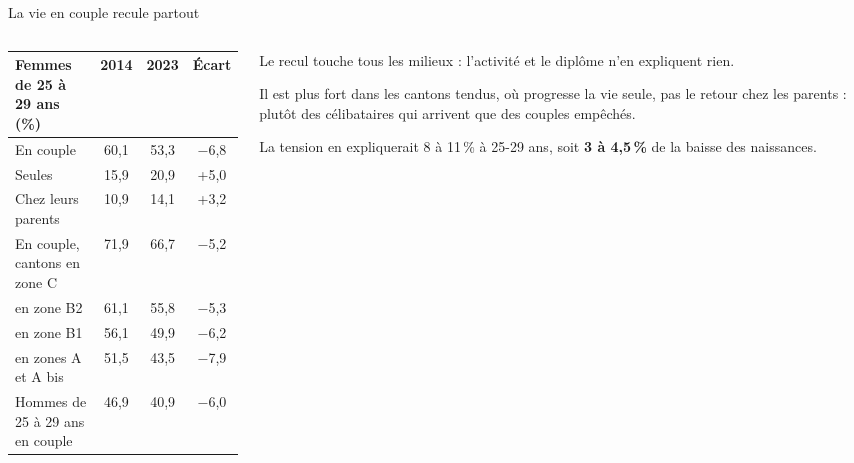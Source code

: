 \documentclass[10pt,aspectratio=169]{beamer}
\begin{document}
\begin{frame}{La vie en couple recule partout}
  \begin{columns}[T]
    \begin{column}{0.54\textwidth}
      \footnotesize\setlength{\tabcolsep}{4pt}
      \begin{tabular}{@{}lccc@{}}
        \toprule
        Femmes de 25 à 29 ans (\%) & 2014 & 2023 & Écart \\
        \midrule
        En couple & 60,1 & 53,3 & $-$6,8 \\
        Seules & 15,9 & 20,9 & +5,0 \\
        Chez leurs parents & 10,9 & 14,1 & +3,2 \\
        \midrule
        En couple, cantons en zone C & 71,9 & 66,7 & $-$5,2 \\
        \quad en zone B2 & 61,1 & 55,8 & $-$5,3 \\
        \quad en zone B1 & 56,1 & 49,9 & $-$6,2 \\
        \quad en zones A et A bis & 51,5 & 43,5 & $-$7,9 \\
        \midrule
        Hommes de 25 à 29 ans en couple & 46,9 & 40,9 & $-$6,0 \\
        \bottomrule
      \end{tabular}
    \end{column}
    \begin{column}{0.42\textwidth}
      \small
      \begin{aere}
        \item Le recul touche \alert{tous les milieux} : l'activité et le diplôme n'en expliquent rien.
        \item Il est plus fort dans les cantons tendus, où progresse la vie seule, pas le retour chez les parents : plutôt des célibataires qui arrivent que des couples empêchés.
        \item La tension en expliquerait 8 à 11\,\% à 25-29 ans, soit \textbf{3 à 4,5\,\%} de la baisse des naissances.
      \end{aere}
    \end{column}
  \end{columns}
\end{frame}
\end{document}
